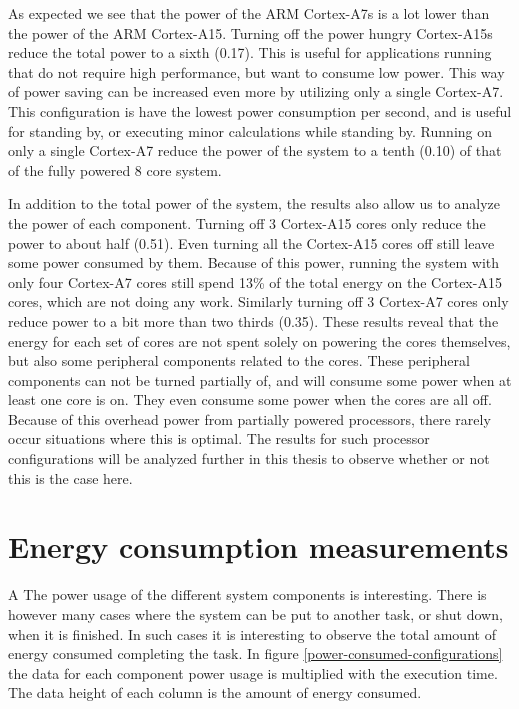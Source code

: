 As expected we see that the power of the ARM Cortex-A7s is a lot lower than the power of the ARM Cortex-A15.
Turning off the power hungry Cortex-A15s reduce the total power to a sixth (0.17).
This is useful for applications running that do not require high performance, but want to consume low power.
This way of power saving can be increased even more by utilizing only a single Cortex-A7.
This configuration is have the lowest power consumption per second, and is useful for standing by, or executing minor calculations while standing by.
Running on only a single Cortex-A7 reduce the power of the system to a tenth (0.10) of that of the fully powered 8 core system.

In addition to the total power of the system, the results also allow us to analyze the power of each component.
Turning off 3 Cortex-A15 cores only reduce the power to about half (0.51).
Even turning all the Cortex-A15 cores off still leave some power consumed by them.
Because of this power, running the system with only four Cortex-A7 cores still spend 13\% of the total energy on the Cortex-A15 cores, which are not doing any work.
Similarly turning off 3 Cortex-A7 cores only reduce power to a bit more than two thirds (0.35).
These results reveal that the energy for each set of cores are not spent solely on powering the cores themselves, but also some peripheral components related to the cores.
These peripheral components can not be turned partially of, and will consume some power when at least one core is on.
They even consume some power when the cores are all off.
Because of this overhead power from partially powered processors, there rarely occur situations where this is optimal.
The results for such processor configurations will be analyzed further in this thesis to observe whether or not this is the case here.
\section{Energy consumption measurements}A \label{energyconsumptionmeasurements}
The power usage of the different system components is interesting.
There is however many cases where the system can be put to another task, or shut down, when it is finished.
In such cases it is interesting to observe the total amount of energy consumed completing the task.
In figure \ref{power-consumed-configurations} the data for each component power usage is multiplied with the execution time.
The data height of each column is the amount of energy consumed.

